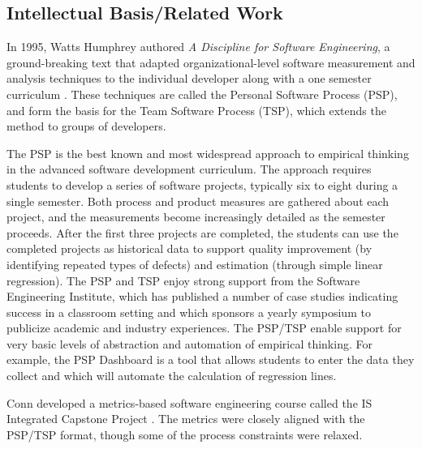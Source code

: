 \subsection{Intellectual Basis/Related Work}



In 1995, Watts Humphrey authored {\em A Discipline for Software
Engineering}, a ground-breaking text that adapted organizational-level
software measurement and analysis techniques to the individual developer
along with a one semester curriculum \citep{Humphrey95}. These techniques are called the
Personal Software Process (PSP), and form the basis for the Team Software
Process (TSP), which extends the method to groups of developers. 

The PSP is the best known and most widespread approach to empirical
thinking in the advanced software development curriculum.  The approach
requires students to develop a series of software projects, typically six
to eight during a single semester.  Both process and product measures are
gathered about each project, and the measurements become increasingly
detailed as the semester proceeds. After the first three projects are
completed, the students can use the completed projects as historical data
to support quality improvement (by identifying repeated types of defects)
and estimation (through simple linear regression).  The PSP and TSP enjoy
strong support from the Software Engineering Institute, which has published
a number of case studies indicating success in a classroom setting and
which sponsors a yearly symposium to publicize academic and industry
experiences.  The PSP/TSP enable support for very basic levels of
abstraction and automation of empirical thinking. For example, the PSP
Dashboard is a tool that allows students to enter the data they collect and
which will automate the calculation of regression lines.

Conn developed a metrics-based software engineering course called the 
IS Integrated Capstone Project \citep{Conn04}.  The metrics were closely aligned
with the PSP/TSP format, though some of the process constraints were relaxed. 

